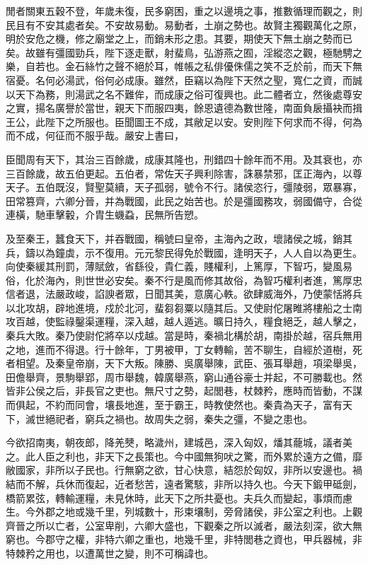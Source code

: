 閒者關東五穀不登，年歲未復，民多窮困，重之以邊境之事，推數循理而觀之，則民且有不安其處者矣。不安故易動。易動者，土崩之勢也。故賢主獨觀萬化之原，明於安危之機，修之廟堂之上，而銷未形之患。其要，期使天下無土崩之勢而已矣。故雖有彊國勁兵，陛下逐走獸，射蜚鳥，弘游燕之囿，淫縱恣之觀，極馳騁之樂，自若也。金石絲竹之聲不絕於耳，帷帳之私俳優侏儒之笑不乏於前，而天下無宿憂。名何必湯武，俗何必成康。雖然，臣竊以為陛下天然之聖，寬仁之資，而誠以天下為務，則湯武之名不難侔，而成康之俗可復興也。此二體者立，然後處尊安之實，揚名廣譽於當世，親天下而服四夷，餘恩遺德為數世隆，南面負扆攝袂而揖王公，此陛下之所服也。臣聞圖王不成，其敝足以安。安則陛下何求而不得，何為而不成，何征而不服乎哉。嚴安上書曰，

臣聞周有天下，其治三百餘歲，成康其隆也，刑錯四十餘年而不用。及其衰也，亦三百餘歲，故五伯更起。五伯者，常佐天子興利除害，誅暴禁邪，匡正海內，以尊天子。五伯既沒，賢聖莫續，天子孤弱，號令不行。諸侯恣行，彊陵弱，眾暴寡，田常篡齊，六卿分晉，并為戰國，此民之始苦也。於是彊國務攻，弱國備守，合從連橫，馳車擊轂，介胄生蟣蝨，民無所告愬。

及至秦王，蠶食天下，并吞戰國，稱號曰皇帝，主海內之政，壞諸侯之城，銷其兵，鑄以為鐘虡，示不復用。元元黎民得免於戰國，逢明天子，人人自以為更生。向使秦緩其刑罰，薄賦斂，省繇役，貴仁義，賤權利，上篤厚，下智巧，變風易俗，化於海內，則世世必安矣。秦不行是風而修其故俗，為智巧權利者進，篤厚忠信者退，法嚴政峻，諂諛者眾，日聞其美，意廣心軼。欲肆威海外，乃使蒙恬將兵以北攻胡，辟地進境，戍於北河，蜚芻芻粟以隨其后。又使尉佗屠睢將樓船之士南攻百越，使監祿鑿渠運糧，深入越，越人遁逃。曠日持久，糧食絕乏，越人擊之，秦兵大敗。秦乃使尉佗將卒以戍越。當是時，秦禍北構於胡，南掛於越，宿兵無用之地，進而不得退。行十餘年，丁男被甲，丁女轉輸，苦不聊生，自經於道樹，死者相望。及秦皇帝崩，天下大叛。陳勝、吳廣舉陳，武臣、張耳舉趙，項梁舉吳，田儋舉齊，景駒舉郢，周市舉魏，韓廣舉燕，窮山通谷豪士并起，不可勝載也。然皆非公侯之后，非長官之吏也。無尺寸之勢，起閭巷，杖棘矜，應時而皆動，不謀而俱起，不約而同會，壤長地進，至于霸王，時教使然也。秦貴為天子，富有天下，滅世絕祀者，窮兵之禍也。故周失之弱，秦失之彊，不變之患也。

今欲招南夷，朝夜郎，降羌僰，略濊州，建城邑，深入匈奴，燔其蘢城，議者美之。此人臣之利也，非天下之長策也。今中國無狗吠之驚，而外累於遠方之備，靡敝國家，非所以子民也。行無窮之欲，甘心快意，結怨於匈奴，非所以安邊也。禍結而不解，兵休而復起，近者愁苦，遠者驚駭，非所以持久也。今天下鍛甲砥劍，橋箭累弦，轉輸運糧，未見休時，此天下之所共憂也。夫兵久而變起，事煩而慮生。今外郡之地或幾千里，列城數十，形束壤制，旁脅諸侯，非公室之利也。上觀齊晉之所以亡者，公室卑削，六卿大盛也，下觀秦之所以滅者，嚴法刻深，欲大無窮也。今郡守之權，非特六卿之重也，地幾千里，非特閭巷之資也，甲兵器械，非特棘矜之用也，以遭萬世之變，則不可稱諱也。

